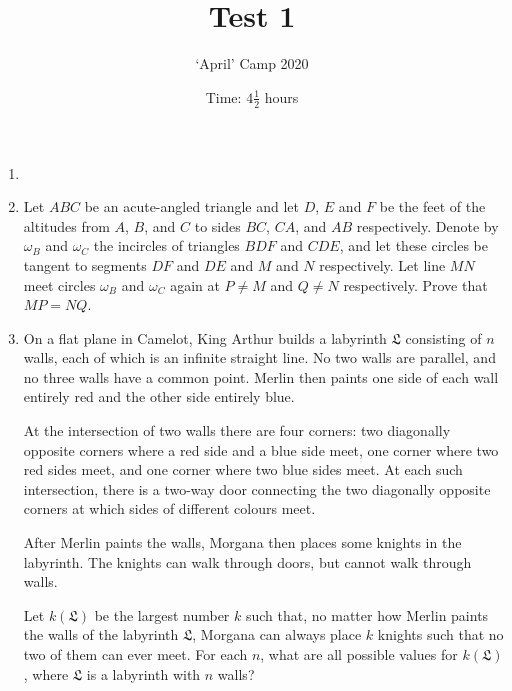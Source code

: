 \documentclass{article}
\title{Test 1}
\author{`April' Camp 2020}
\date{Time: $4\frac{1}{2}$ hours}
\begin{document}
\maketitle
\thispagestyle{empty}


\begin{enumerate}[1.]

\vfill
\item %


\vfill
\item %
Let $ABC$ be an acute-angled triangle and let $D$, $E$ and $F$ be the feet of the altitudes from $A$, $B$, and $C$ to sides $BC$, $CA$, and $AB$ respectively.
Denote by $\omega_B$ and $\omega_C$ the incircles of triangles $BDF$ and $CDE$, and let these circles be tangent to segments $DF$ and $DE$ and $M$ and $N$ respectively.
Let line $MN$ meet circles $\omega_B$ and $\omega_C$ again at $P \neq M$ and $Q \neq N$ respectively.
Prove that $MP = NQ$.


\vfill
\item %
\newcommand{\LL}{\mathfrak{L}}
On a flat plane in Camelot, King Arthur builds a labyrinth $\LL$ consisting of $n$ walls, each of which is an infinite straight line.
No two walls are parallel, and no three walls have a common point.
Merlin then paints one side of each wall entirely red and the other side entirely blue.

At the intersection of two walls there are four corners: two diagonally opposite corners where a red side and a blue side meet, one corner where two red sides meet, and one corner where two blue sides meet.
At each such intersection, there is a two-way door connecting the two diagonally opposite corners at which sides of different colours meet.

After Merlin paints the walls, Morgana then places some knights in the labyrinth.
The knights can walk through doors, but cannot walk through walls.

Let $k(\LL)$ be the largest number $k$ such that, no matter how Merlin paints the walls of the labyrinth $\LL$, Morgana can always place $k$ knights such that no two of them can ever meet.
For each $n$, what are all possible values for $k(\LL)$, where $\LL$ is a labyrinth with $n$ walls?

\vfill
\end{enumerate}


\vfill
\centering
\begin{BVerbatim}
\end{BVerbatim}
\end{document}
